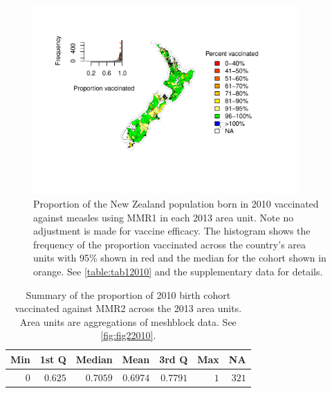 \documentclass{article}
\begin{document}
\begin{figure}
\begin{center}
    \includegraphics[width=0.9\textwidth]{nir_census_MMR1_NIR_2010.pdf}
\end{center}
    \caption{Proportion of the New Zealand population born in 2010 vaccinated against measles using MMR1 in each 2013 area unit. Note no adjustment is made for vaccine efficacy. The histogram shows the frequency of the proportion vaccinated across the country's area units with 95\% shown in red and the median for the cohort shown in orange. See \autoref{table:tab12010} and the supplementary data for details.}
\label{fig:fig12010}
\end{figure}

 \vspace{5mm} %
\begin{table}
\begin{center}
\begin{tabular}{rrrrrrr}
\hline\hline
\multicolumn{1}{c}{Min}&\multicolumn{1}{c}{1st Q}&\multicolumn{1}{c}{Median}&\multicolumn{1}{c}{Mean}&\multicolumn{1}{c}{3rd Q}&\multicolumn{1}{c}{Max}&\multicolumn{1}{c}{NA}\tabularnewline
\hline
$0$&$0.625$&$0.7059$&$0.6974$&$0.7791$&$1$&$321$\tabularnewline
\hline
\end{tabular}\end{center}\caption{Summary of the proportion of 2010 birth cohort vaccinated against MMR2 across the 2013 area units. Area units are aggregations of meshblock data. See \autoref{fig:fig22010}.}
\label{table:tab22010}
\end{table}
\end{document}
